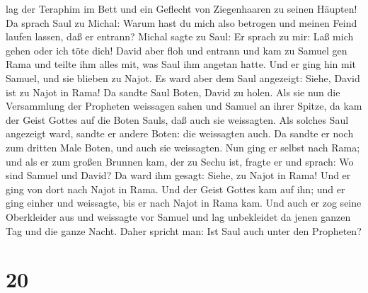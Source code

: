 lag der Teraphim im Bett und ein Geflecht von Ziegenhaaren zu seinen
Häupten!  Da sprach Saul zu Michal: Warum hast du mich
also betrogen und meinen Feind laufen lassen, daß er entrann? Michal
sagte zu Saul: Er sprach zu mir: Laß mich gehen oder ich töte dich!
 David aber floh und entrann und kam zu Samuel gen Rama
und teilte ihm alles mit, was Saul ihm angetan hatte. Und er ging hin
mit Samuel, und sie blieben zu Najot.  Es ward aber dem
Saul angezeigt: Siehe, David ist zu Najot in Rama!  Da
sandte Saul Boten, David zu holen. Als sie nun die Versammlung der
Propheten weissagen sahen und Samuel an ihrer Spitze, da kam der Geist
Gottes auf die Boten Sauls, daß auch sie weissagten.  Als
solches Saul angezeigt ward, sandte er andere Boten: die weissagten
auch. Da sandte er noch zum dritten Male Boten, und auch sie weissagten.
 Nun ging er selbst nach Rama; und als er zum großen
Brunnen kam, der zu Sechu ist, fragte er und sprach: Wo sind Samuel und
David? Da ward ihm gesagt: Siehe, zu Najot in Rama!  Und
er ging von dort nach Najot in Rama. Und der Geist Gottes kam auf ihn;
und er ging einher und weissagte, bis er nach Najot in Rama kam.
 Und auch er zog seine Oberkleider aus und weissagte vor
Samuel und lag unbekleidet da jenen ganzen Tag und die ganze Nacht.
Daher spricht man: Ist Saul auch unter den Propheten?

\hypertarget{section-19}{%
\section{20}\label{section-19}}

